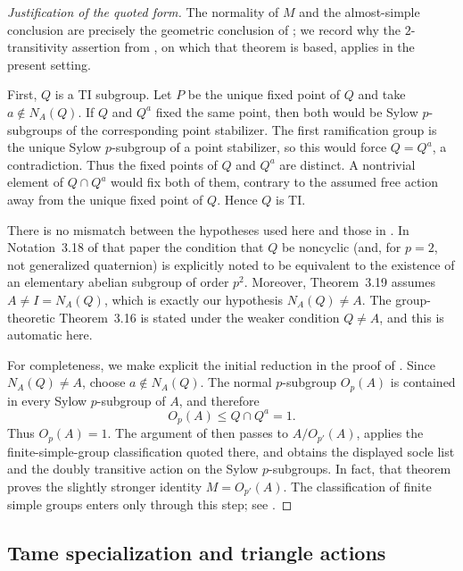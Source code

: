 \documentclass[10pt,a4paper]{amsart}
\begin{document}
\begin{proof}[Justification of the quoted form]
The normality of $M$ and the almost-simple conclusion are precisely the
geometric conclusion of \cite[Theorem~3.19]{GMP}; we record why the
$2$-transitivity assertion from \cite[Theorem~3.16]{GMP}, on which that
theorem is based, applies in the present setting.

First, $Q$ is a TI subgroup. Let $P$ be the unique fixed point of $Q$
and take $a\notin N_A(Q)$. If $Q$ and $Q^a$ fixed the same point, then
both would be Sylow $p$-subgroups of the corresponding point
stabilizer. The first ramification group is the unique Sylow
$p$-subgroup of a point stabilizer, so this would force $Q=Q^a$, a
contradiction. Thus the fixed points of $Q$ and $Q^a$ are distinct. A
nontrivial element of $Q\cap Q^a$ would fix both of them, contrary to
the assumed free action away from the unique fixed point of $Q$. Hence
$Q$ is TI.

There is no mismatch between the hypotheses used here and those in
\cite{GMP}. In Notation~3.18 of that paper the condition that $Q$ be
noncyclic (and, for $p=2$, not generalized quaternion) is explicitly
noted to be equivalent to the existence of an elementary abelian
subgroup of order $p^2$. Moreover, Theorem~3.19 assumes
$A\ne I=N_A(Q)$, which is exactly our hypothesis $N_A(Q)\ne A$.
The group-theoretic Theorem~3.16 is stated under the weaker condition
$Q\ne A$, and this is automatic here.

For completeness, we make explicit the initial reduction in the proof
of \cite[Theorem~3.16]{GMP}. Since $N_A(Q)\ne A$, choose
$a\notin N_A(Q)$. The normal $p$-subgroup $O_p(A)$ is contained in
every Sylow $p$-subgroup of $A$, and therefore
\[
        O_p(A)\le Q\cap Q^a=1.
\]
Thus $O_p(A)=1$. The argument of \cite[Theorem~3.16]{GMP} then passes
to $A/O_{p'}(A)$, applies the finite-simple-group classification quoted
there, and obtains the displayed socle list and the doubly transitive
action on the Sylow $p$-subgroups. In fact, that theorem proves the
slightly stronger identity $M=O_{p'}(A)$. The classification of finite
simple groups enters only through this step; see
\cite[Remark~3.17]{GMP}.
\end{proof}


\subsection{Tame specialization and triangle actions}\label{subsec:tame-specialization}
\end{document}
